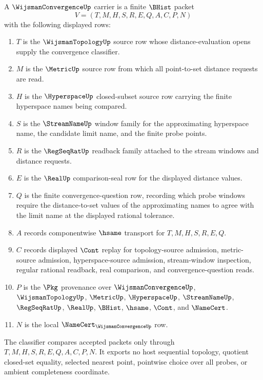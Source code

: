 \begin{definition}
\label{def:wijsman-convergence-carrier}
A $\WijsmanConvergenceUp$ carrier is a finite $\BHist$ packet
$$
V=(T,M,H,S,R,E,Q,A,C,P,N)
$$
with the following displayed rows:
\begin{enumerate}
\item $T$ is the $\WijsmanTopologyUp$ source row whose distance-evaluation opens supply the convergence classifier.
\item $M$ is the $\MetricUp$ source row from which all point-to-set distance requests are read.
\item $H$ is the $\HyperspaceUp$ closed-subset source row carrying the finite hyperspace names being compared.
\item $S$ is the $\StreamNameUp$ window family for the approximating hyperspace name, the candidate limit name, and the finite probe points.
\item $R$ is the $\RegSeqRatUp$ readback family attached to the stream windows and distance requests.
\item $E$ is the $\RealUp$ comparison-seal row for the displayed distance values.
\item $Q$ is the finite convergence-question row, recording which probe windows require the distance-to-set values of the approximating names to agree with the limit name at the displayed rational tolerance.
\item $A$ records componentwise $\hsame$ transport for $T,M,H,S,R,E,Q$.
\item $C$ records displayed $\Cont$ replay for topology-source admission, metric-source admission, hyperspace-source admission, stream-window inspection, regular rational readback, real comparison, and convergence-question reads.
\item $P$ is the $\Pkg$ provenance over $\WijsmanConvergenceUp$, $\WijsmanTopologyUp$, $\MetricUp$, $\HyperspaceUp$, $\StreamNameUp$, $\RegSeqRatUp$, $\RealUp$, $\BHist$, $\hsame$, $\Cont$, and $\NameCert$.
\item $N$ is the local $\NameCert_{\WijsmanConvergenceUp}$ row.
\end{enumerate}
The classifier compares accepted packets only through $T,M,H,S,R,E,Q,A,C,P,N$. It exports no host sequential topology, quotient closed-set equality, selected nearest point, pointwise choice over all probes, or ambient completeness coordinate.
\end{definition}

